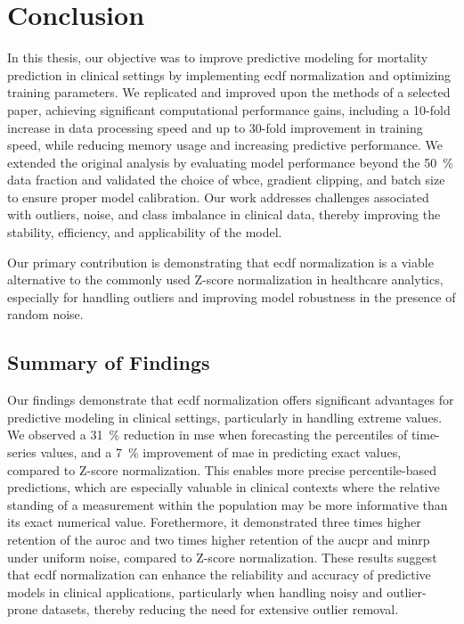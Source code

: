 \chapter{Conclusion}
\label{ch:conclusion}

\glsresetall

In this thesis, our objective was to improve predictive modeling for mortality prediction in clinical settings by implementing \gls{ecdf} normalization and optimizing training parameters. We replicated and improved upon the methods of a selected paper, achieving significant computational performance gains, including a 10-fold increase in data processing speed and up to 30-fold improvement in training speed, while reducing memory usage and increasing predictive performance. We extended the original analysis by evaluating model performance beyond the \qty{50}{\percent} data fraction and validated the choice of \gls{wbce}, gradient clipping, and batch size to ensure proper model calibration. Our work addresses challenges associated with outliers, noise, and class imbalance in clinical data, thereby improving the stability, efficiency, and applicability of the model.

Our primary contribution is demonstrating that \gls{ecdf} normalization is a viable alternative to the commonly used Z-score normalization in healthcare analytics, especially for handling outliers and improving model robustness in the presence of random noise.

\section{Summary of Findings}

Our findings demonstrate that \gls{ecdf} normalization offers significant advantages for predictive modeling in clinical settings, particularly in handling extreme values.  We observed a \qty{31}{\percent} reduction in \gls{mse} when forecasting the percentiles of time-series values, and a \qty{7}{\percent} improvement of {\gls{mae}} in predicting exact values, compared to Z-score normalization. This enables more precise percentile-based predictions, which are especially valuable in clinical contexts where the relative standing of a measurement within the population may be more informative than its exact numerical value. Forethermore, it demonstrated three times higher retention of the \gls{auroc} and two times higher retention of the \gls{aucpr} and \gls{minrp} under uniform noise, compared to Z-score normalization. These results suggest that \gls{ecdf} normalization can enhance the reliability and accuracy of predictive models in clinical applications, particularly when handling noisy and outlier-prone datasets, thereby reducing the need for extensive outlier removal.


